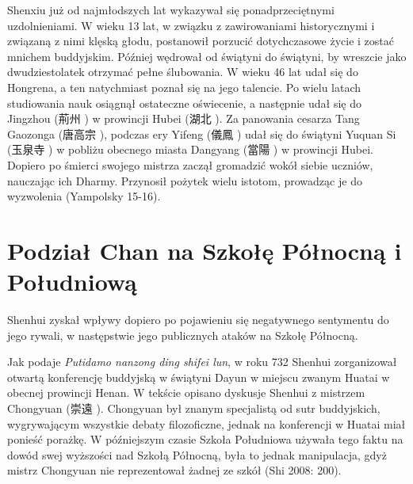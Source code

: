 Shenxiu już od najmłodszych lat wykazywał się ponadprzeciętnymi uzdolnieniami.
W wieku 13 lat, w związku z zawirowaniami historycznymi i związaną z nimi klęską głodu, postanowił porzucić dotychczasowe życie i zostać mnichem buddyjskim.
Później wędrował od świątyni do świątyni, by wreszcie jako dwudziestolatek otrzymać pełne ślubowania.
W wieku 46 lat udał się do Hongrena, a ten natychmiast poznał się na jego talencie.
Po wielu latach studiowania nauk osiągnął ostateczne oświecenie, a następnie udał się do Jingzhou (荊州 ) w prowincji Hubei (湖北 ).
Za panowania cesarza Tang Gaozonga (唐高宗 ), podczas ery Yifeng (儀鳳 ) udał się do świątyni Yuquan Si (玉泉寺 ) w pobliżu obecnego miasta Dangyang (當陽 ) w prowincji Hubei.
Dopiero po śmierci swojego mistrza zaczął gromadzić wokół siebie uczniów, nauczając ich Dharmy. Przynosił pożytek wielu istotom, prowadząc je do wyzwolenia
(Yampolsky 15-16).
\fi

\section{Podział Chan na Szkołę Północną i Południową}
Shenhui zyskał wpływy dopiero po pojawieniu się negatywnego sentymentu do jego rywali, w następstwie jego publicznych ataków na Szkołę Północną.

Jak podaje \textit{Putidamo nanzong ding shifei lun}, w roku 732 Shenhui zorganizował otwartą konferencję buddyjską w świątyni Dayun w miejscu zwanym Huatai w obecnej prowincji Henan.\label{Huatai}
W tekście opisano dyskusje Shenhui z mistrzem Chongyuan (崇遠 ).
Chongyuan był znanym specjalistą od sutr buddyjskich, wygrywającym wszystkie debaty filozoficzne, jednak na konferencji w Huatai miał ponieść porażkę.
W późniejszym czasie Szkoła Południowa używała tego faktu na dowód swej wyższości nad Szkołą Północną, była to jednak manipulacja, gdyż mistrz Chongyuan nie reprezentował żadnej ze szkół
(Shi 2008: 200).


